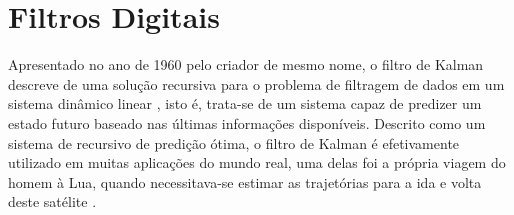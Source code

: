 \documentclass[conference]{IEEEtran}
\begin{document}
\section{Filtros Digitais} \label{sec:filters}
Apresentado no ano de 1960 pelo criador de mesmo nome, o filtro de Kalman descreve de uma solução recursiva para o problema de filtragem de dados em um sistema dinâmico linear \cite{WelchBishop}, isto é, trata-se de um sistema capaz de predizer um estado futuro baseado nas últimas informações disponíveis. Descrito como um sistema de recursivo de predição ótima, o filtro de Kalman é efetivamente utilizado em muitas aplicações do mundo real, uma delas foi a própria viagem do homem à Lua, quando necessitava-se estimar as trajetórias para a ida e volta deste satélite \cite{GrewalAndrews}.

\end{document}
